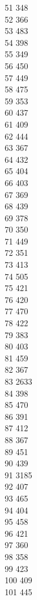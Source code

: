 { 51	348 \\
 52	366 \\
 53	483 \\
 54	398 \\
 55	349 \\
 56	450 \\
 57	449 \\
 58	475 \\
 59	353 \\
 60	437 \\
 61	409 \\
 62	444 \\
 63	367 \\
 64	432 \\
 65	404 \\
 66	403 \\
 67	369 \\
 68	439 \\
 69	378 \\
 70	350 \\
 71	449 \\
 72	351 \\
 73	413 \\
 74	505 \\
 75	421 \\
 76	420 \\
 77	470 \\
 78	422 \\
 79	383 \\
 80	403 \\
 81	459 \\
 82	367 \\
 83	2633 \\
 84	398 \\
 85	470 \\
 86	391 \\
 87	412 \\
 88	367 \\
 89	451 \\
 90	439 \\
 91	3185 \\
 92	407 \\
 93	465 \\
 94	404 \\
 95	458 \\
 96	421 \\
 97	360 \\
 98	358 \\
 99	423 \\
 100	409 \\
 101	445 \\
}
